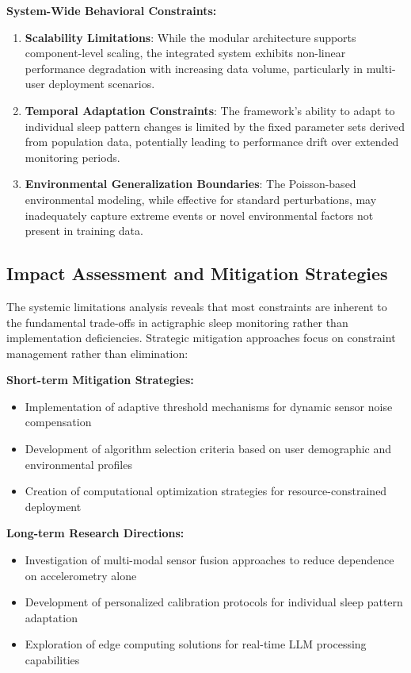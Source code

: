 \documentclass[conference]{IEEEtran}
\begin{document}
\textbf{System-Wide Behavioral Constraints:}
\begin{enumerate}
    \item \textbf{Scalability Limitations}: While the modular architecture supports component-level scaling, the integrated system exhibits non-linear performance degradation with increasing data volume, particularly in multi-user deployment scenarios.
    
    \item \textbf{Temporal Adaptation Constraints}: The framework's ability to adapt to individual sleep pattern changes is limited by the fixed parameter sets derived from population data, potentially leading to performance drift over extended monitoring periods.
    
    \item \textbf{Environmental Generalization Boundaries}: The Poisson-based environmental modeling, while effective for standard perturbations, may inadequately capture extreme events or novel environmental factors not present in training data.
\end{enumerate}

\subsection{Impact Assessment and Mitigation Strategies}
The systemic limitations analysis reveals that most constraints are inherent to the fundamental trade-offs in actigraphic sleep monitoring rather than implementation deficiencies. Strategic mitigation approaches focus on constraint management rather than elimination:

\textbf{Short-term Mitigation Strategies:}
\begin{itemize}
    \item Implementation of adaptive threshold mechanisms for dynamic sensor noise compensation
    \item Development of algorithm selection criteria based on user demographic and environmental profiles
    \item Creation of computational optimization strategies for resource-constrained deployment
\end{itemize}

\textbf{Long-term Research Directions:}
\begin{itemize}
    \item Investigation of multi-modal sensor fusion approaches to reduce dependence on accelerometry alone
    \item Development of personalized calibration protocols for individual sleep pattern adaptation
    \item Exploration of edge computing solutions for real-time LLM processing capabilities
\end{itemize}
\end{document}
